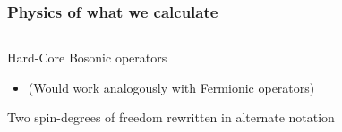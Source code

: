 \begin{frame}
    \frametitle{Physics of what we calculate}

    \begin{columns}
            \begin{wideitemize}
                \item Hard-Core Bosonic operators
                \begin{itemize}
                    \item (Would work analogously with Fermionic operators)
                \end{itemize}
                \item Two spin-degrees of freedom rewritten in alternate notation
            \end{wideitemize}

            \onslide
            
    \end{columns}
    

\end{frame}
